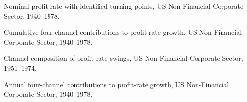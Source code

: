
\caption{Nominal profit rate with identified turning points,
  US Non-Financial Corporate Sector, 1940--1978.}
\label{fig:B4}

\caption{Cumulative four-channel contributions to profit-rate growth,
  US Non-Financial Corporate Sector, 1940--1978.}
\label{fig:B2a}

\caption{Channel composition of profit-rate swings,
  US Non-Financial Corporate Sector, 1951--1974.}
\label{fig:B3}


\caption{Annual four-channel contributions to profit-rate growth,
  US Non-Financial Corporate Sector, 1940--1978.}
\label{fig:B2b}
